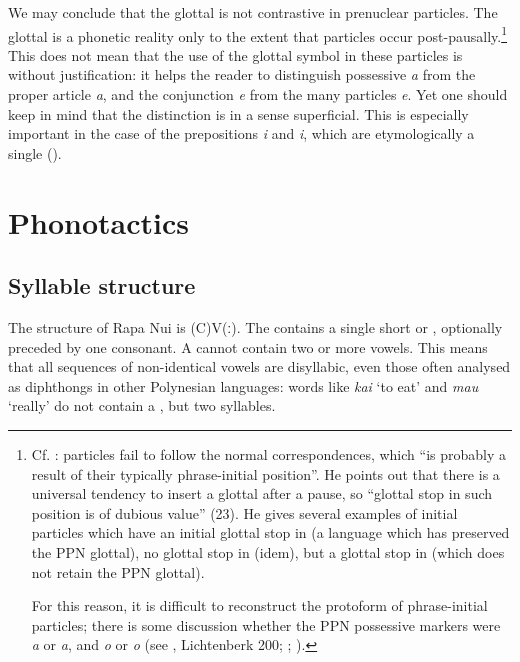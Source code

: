 We may conclude that the glottal is not contrastive in prenuclear particles. The glottal is a phonetic reality only to the extent that particles occur post-pausally.\footnote{\label{fn:37}Cf. \citet[222]{Clark1976}: particles fail to follow the normal correspondences, which “is probably a result of their typically phrase-initial position”. He points out that there is a universal tendency to insert a glottal after a pause, so “glottal stop in such position is of dubious value” (23). He gives several examples of initial particles which have an initial glottal stop in  (a language which has preserved the PPN glottal), no glottal stop in  (idem), but a glottal stop in  (which does not retain the PPN glottal).

For this reason, it is difficult to reconstruct the protoform of phrase-initial particles; there is some discussion whether the PPN possessive markers were \textit{a} or \textit{{\ꞌ}a}, and \textit{o} or \textit{{\ꞌ}o} (see \citealt{Fischer2000Rapanui}, Lichtenberk 200; \citealt{Wilson1982}; \citealt{Lynch1997}).} This does not mean that the use of the glottal symbol in these particles is without justification: it helps the reader to distinguish possessive \textit{{\ꞌ}a} from the proper article \textit{a}, and the conjunction \textit{{\ꞌ}e} from the many particles \textit{e}. Yet one should keep in mind that the distinction is in a sense superficial. This is especially important in the case of the prepositions \textit{{\ꞌ}i} and \textit{i}, which are etymologically a single  (). 
\section{Phonotactics}\label{sec:2.3}
\subsection{Syllable structure}\label{sec:2.3.1}
The  structure of Rapa Nui is (C)V(ː). The  contains a single short or , optionally preceded by one consonant. A  cannot contain two or more vowels. This means that all sequences of non-identical vowels are disyllabic, even those often analysed as diphthongs in other Polynesian languages: words like \textit{kai} ‘to eat’ and \textit{mau} ‘really’ do not contain a , but two syllables. 

